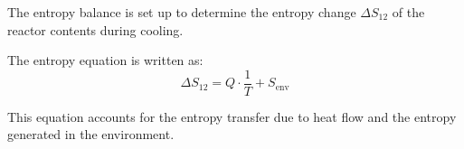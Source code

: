 The entropy balance is set up to determine the entropy change \( \Delta S_{12} \) of the reactor contents during cooling.  

The entropy equation is written as:  
\[
\Delta S_{12} = Q \cdot \frac{1}{T} + S_{\text{env}}
\]  

This equation accounts for the entropy transfer due to heat flow and the entropy generated in the environment.